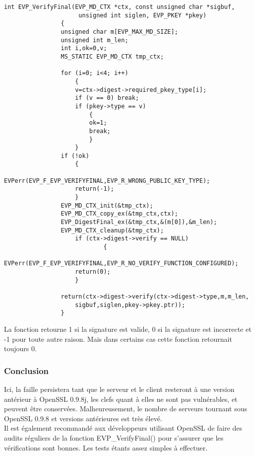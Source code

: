 		
			\begin{lstlisting}[style=customc,caption=EVP\_VerifyFinal.c, label=evp]
				int EVP_VerifyFinal(EVP_MD_CTX *ctx, const unsigned char *sigbuf,
				     unsigned int siglen, EVP_PKEY *pkey)
				{
				unsigned char m[EVP_MAX_MD_SIZE];
				unsigned int m_len;
				int i,ok=0,v;
				MS_STATIC EVP_MD_CTX tmp_ctx;

				for (i=0; i<4; i++)
					{
					v=ctx->digest->required_pkey_type[i];
					if (v == 0) break;
					if (pkey->type == v)
						{
						ok=1;
						break;
						}
					}
				if (!ok)
					{
					EVPerr(EVP_F_EVP_VERIFYFINAL,EVP_R_WRONG_PUBLIC_KEY_TYPE);
					return(-1);
					}
				EVP_MD_CTX_init(&tmp_ctx);
				EVP_MD_CTX_copy_ex(&tmp_ctx,ctx);     
				EVP_DigestFinal_ex(&tmp_ctx,&(m[0]),&m_len);
				EVP_MD_CTX_cleanup(&tmp_ctx);
			        if (ctx->digest->verify == NULL)
			                {
					EVPerr(EVP_F_EVP_VERIFYFINAL,EVP_R_NO_VERIFY_FUNCTION_CONFIGURED);
					return(0);
					}

				return(ctx->digest->verify(ctx->digest->type,m,m_len,
					sigbuf,siglen,pkey->pkey.ptr));
				}
			\end{lstlisting}     

			La fonction retourne 1 si la signature est valide, 0 si la signature est incorrecte et -1 pour toute autre raison. Mais dans certains cas cette fonction retournait toujours 0.
	
		\subsubsection{Conclusion}

			Ici, la faille persistera tant que le serveur et le client resteront à une version antérieur à OpenSSL 0.9.8j, les clefs quant à elles ne sont pas vulnérables, et peuvent être conservées. Malheureusement, le nombre de serveurs tournant sous OpenSSL 0.9.8 et versions antérieures est très élevé.\\

			Il est également recommandé aux développeurs utilisant OpenSSL de faire des audits réguliers de la fonction EVP\_VerifyFinal() pour s'assurer que les vérifications sont bonnes. Les tests étants assez simples à effectuer.
